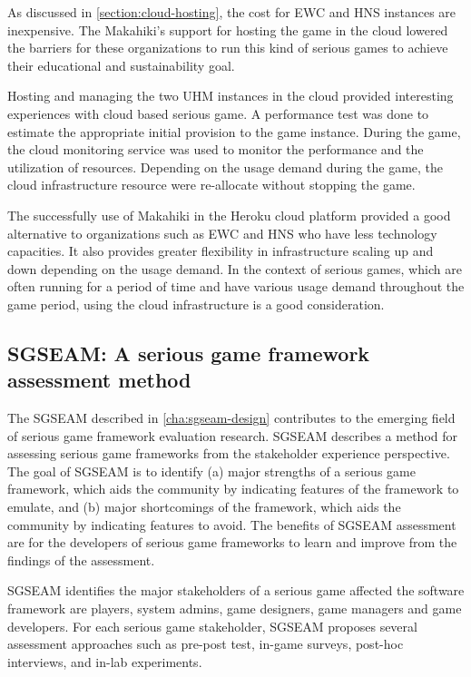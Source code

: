 As discussed in \autoref{section:cloud-hosting}, the cost for EWC and HNS instances are inexpensive. The Makahiki's support for hosting the game in the cloud lowered the barriers for these organizations to run this kind of serious games to achieve their educational and sustainability goal.

Hosting and managing the two UHM instances in the cloud provided interesting experiences with cloud based serious game. A performance test was done to estimate the appropriate initial provision to the game instance. During the game, the cloud monitoring service was used to monitor the performance and the utilization of resources. Depending on the usage demand during the game, the cloud infrastructure resource were re-allocate without stopping the game. 

The successfully use of Makahiki in the Heroku cloud platform provided a good alternative to organizations such as EWC and HNS who have less technology capacities. It also provides greater flexibility in infrastructure scaling up and down depending on the usage demand. In the context of serious games, which are often running for a period of time and have various usage demand throughout the game period, using the cloud infrastructure is a good consideration.

\subsection{SGSEAM: A serious game framework assessment method}

The SGSEAM described in \autoref{cha:sgseam-design} contributes to the emerging field of serious game framework evaluation research. SGSEAM describes a method for assessing serious game frameworks from the stakeholder experience perspective. The goal of SGSEAM is to identify (a) major strengths of a serious game framework, which aids the community by indicating features of the framework to emulate, and
(b) major shortcomings of the framework, which aids the community by indicating features to avoid.
The benefits of SGSEAM assessment are for the developers of serious game frameworks 
to learn and improve from the findings of the assessment.

SGSEAM identifies the major stakeholders of a serious game affected the software framework are players, system admins, game designers, game managers and game developers. For each serious game stakeholder, SGSEAM proposes several assessment approaches such as pre-post test, in-game surveys, post-hoc interviews, and in-lab experiments.

